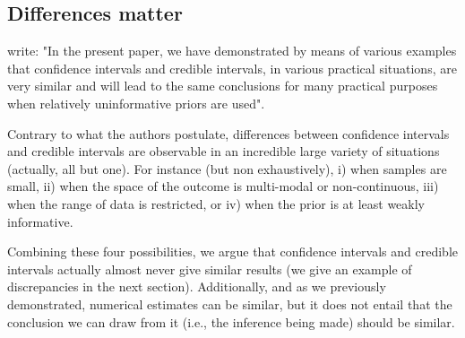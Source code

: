 \documentclass[a4paper,man,natbib,floatsintext,donotrepeattitle]{apa6}
\begin{document}
\subsection{Differences matter}

\cite{albers_credible_2018} write: "In the present paper, we have demonstrated by means of various examples that confidence intervals and credible intervals, in various practical situations, are very similar and will lead to the same conclusions for many practical purposes when relatively uninformative priors are used".

Contrary to what the authors postulate, differences between confidence intervals and credible intervals are observable in an incredible large variety of situations (actually, all but one). For instance (but non exhaustively), i) when samples are small, ii) when the space of the outcome is multi-modal or non-continuous, iii) when the range of data is restricted, or iv) when the prior is at least weakly informative.

Combining these four possibilities, we argue that confidence intervals and credible intervals actually almost never give similar results (we give an example of discrepancies in the next section). Additionally, and as we previously demonstrated, numerical estimates can be similar, but it does not entail that the conclusion we can draw from it (i.e., the inference being made) should be similar.



\end{document}
